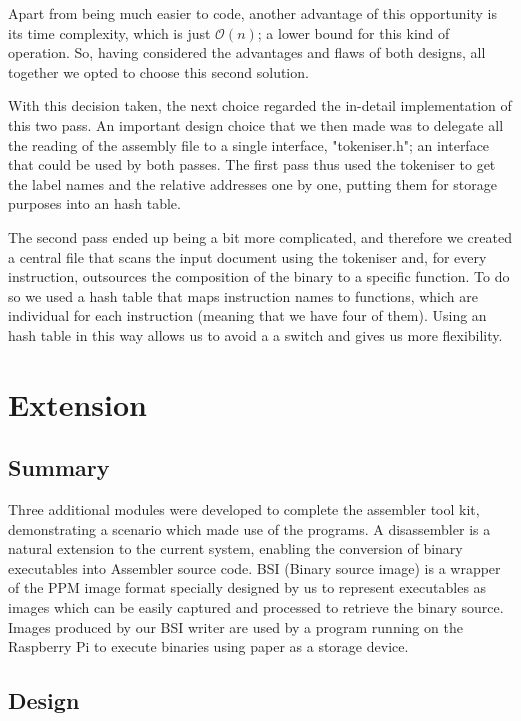 \documentclass[11pt]{article}
\begin{document}
Apart from being much easier to code, another advantage of this opportunity is its time complexity, which is just $\mathcal{O}(n)$; a lower bound for this kind of operation.
So, having considered the advantages and flaws of both designs, all together we opted to choose this second solution.

With this decision taken, the next choice regarded the in-detail implementation of this two pass.
An important design choice that we then made was to delegate all the reading of the assembly file to a single interface, "tokeniser.h"; an interface that could be used by both passes. The first pass thus used the tokeniser to get the label names and the relative addresses one by one, putting them for storage purposes into an hash table.

The second pass ended up being a bit more complicated, and therefore we created a central file that scans the input document using the tokeniser and, for every instruction, outsources the composition of the binary to a specific function. To do so we used a hash table that maps instruction names to functions, which are individual for each instruction (meaning that we have four of them). Using an hash table in this way allows us to avoid a a switch and gives us more flexibility.

\section{Extension}

\subsection{Summary}

Three additional modules were developed to complete the assembler tool kit, demonstrating a scenario which made use of the programs. A disassembler is a natural extension to the current system, enabling the conversion of binary executables into Assembler source code. BSI (Binary source image) is a wrapper of the PPM image format \cite{ppm} specially designed by us to represent executables as images which can be easily captured and processed to retrieve the binary source. Images produced by our BSI writer are used by a program running on the Raspberry Pi to execute binaries using paper as a storage device.

\subsection{Design}
\end{document}
